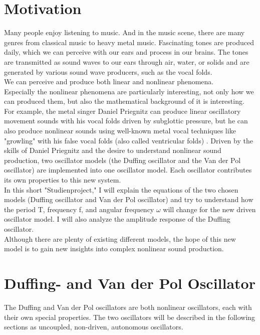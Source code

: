 \documentclass[oneside,10pt,a4paper]{report}
\begin{document}
	
	\tableofcontents
	\chapter{Motivation}
	
		Many people enjoy listening to music. And in the music scene, there are many genres from classical music to heavy metal music. Fascinating tones are produced daily, which we can perceive with our ears and process in our brains. The tones are transmitted as sound waves to our ears through air, water, or solids and are generated by various sound wave producers, such as the vocal folds.\\
		We can perceive and produce both linear and nonlinear phenomena. \\
		Especially the nonlinear phenomena are particularly interesting, not only how we can produced them, but also the mathematical background of it is interesting.\\
		 For example, the metal singer Daniel Priegnitz can produce linear oscillatory movement sounds with his vocal folds driven by subglottic pressure, but he can also produce nonlinear sounds using well-known metal vocal techniques like "growling" with his false vocal folds (also called ventricular folds) \cite{DanielPriegnitz}.
		 Driven by the skills of Daniel Priegnitz and the desire to understand nonlinear sound production, two oscillator models (the Duffing oscillator and the Van der Pol oscillator) are implemented into one oscillator model. Each oscillator contributes its own properties to this new system.\\
		 In this short "Studienproject," I will explain the equations of the two chosen models (Duffing oscillator and Van der Pol oscillator) and try to understand how the period T, frequency f, and angular frequency $\omega$ will change for the new driven oscillator model. I will also analyze the amplitude response of the Duffing oscillator.\\
		 Although there are plenty of existing different models, the hope of this new model is to gain new insights into complex nonlinear sound production.
		 
		 
	\chapter{Duffing- and Van der Pol Oscillator} \label{chapter: Duffing- and Van der Pol Oscillator}
	
		The Duffing and Van der Pol oscillators are both nonlinear oscillators, each with their own special properties. 
		The two oscillators will be described in the following sections as uncoupled, non-driven, autonomous oscillators.
		
\end{document}
